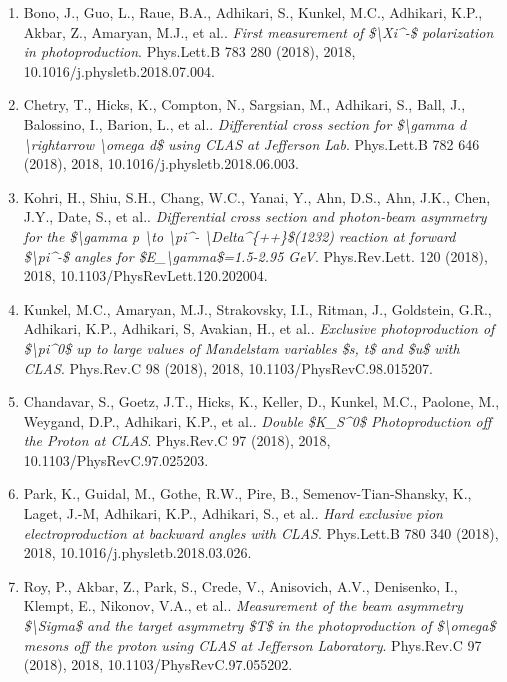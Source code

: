\begin{enumerate}
\item Bono, J., Guo, L., Raue, B.A., Adhikari, S., Kunkel, M.C., Adhikari, K.P., Akbar, Z., Amaryan, M.J., et al.. \textit{First measurement of \$\textbackslash{}Xi\textasciicircum{}-\$ polarization in photoproduction}. Phys.Lett.B 783 280 (2018), 2018, 10.1016/j.physletb.2018.07.004.
\item Chetry, T., Hicks, K., Compton, N., Sargsian, M., Adhikari, S., Ball, J., Balossino, I., Barion, L., et al.. \textit{Differential cross section for \$\textbackslash{}gamma d \textbackslash{}rightarrow \textbackslash{}omega d\$ using CLAS at Jefferson Lab}. Phys.Lett.B 782 646 (2018), 2018, 10.1016/j.physletb.2018.06.003.
\item Kohri, H., Shiu, S.H., Chang, W.C., Yanai, Y., Ahn, D.S., Ahn, J.K., Chen, J.Y., Date, S., et al.. \textit{Differential cross section and photon-beam asymmetry for the \$\textbackslash{}gamma p \textbackslash{}to \textbackslash{}pi\textasciicircum{}- \textbackslash{}Delta\textasciicircum{}\{++\}\$(1232) reaction at forward \$\textbackslash{}pi\textasciicircum{}-\$ angles for \$E\_\textbackslash{}gamma\$=1.5-2.95 GeV}. Phys.Rev.Lett. 120 (2018), 2018, 10.1103/PhysRevLett.120.202004.
\item Kunkel, M.C., Amaryan, M.J., Strakovsky, I.I., Ritman, J., Goldstein, G.R., Adhikari, K.P., Adhikari, S, Avakian, H., et al.. \textit{Exclusive photoproduction of \$\textbackslash{}pi\textasciicircum{}0\$ up to large values of Mandelstam variables \$s, t\$ and \$u\$ with CLAS}. Phys.Rev.C 98 (2018), 2018, 10.1103/PhysRevC.98.015207.
\item Chandavar, S., Goetz, J.T., Hicks, K., Keller, D., Kunkel, M.C., Paolone, M., Weygand, D.P., Adhikari, K.P., et al.. \textit{Double \$K\_S\textasciicircum{}0\$ Photoproduction off the Proton at CLAS}. Phys.Rev.C 97 (2018), 2018, 10.1103/PhysRevC.97.025203.
\item Park, K., Guidal, M., Gothe, R.W., Pire, B., Semenov-Tian-Shansky, K., Laget, J.-M, Adhikari, K.P., Adhikari, S., et al.. \textit{Hard exclusive pion electroproduction at backward angles with CLAS}. Phys.Lett.B 780 340 (2018), 2018, 10.1016/j.physletb.2018.03.026.
\item Roy, P., Akbar, Z., Park, S., Crede, V., Anisovich, A.V., Denisenko, I., Klempt, E., Nikonov, V.A., et al.. \textit{Measurement of the beam asymmetry \$\textbackslash{}Sigma\$ and the target asymmetry \$T\$ in the photoproduction of \$\textbackslash{}omega\$ mesons off the proton using CLAS at Jefferson Laboratory}. Phys.Rev.C 97 (2018), 2018, 10.1103/PhysRevC.97.055202.

\end{enumerate}
